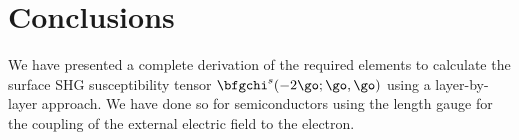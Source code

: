 \documentclass[floatfix,prb,aps,superscriptaddress,11pt,preprint,letterpaper]{revtex4}
\begin{document}
\section{Conclusions}\label{con}

We have presented a complete derivation of the required elements to
calculate the surface SHG susceptibility tensor $\bfgchi^s(-2\go;\go,\go)$ 
using a layer-by-layer approach. We have done so for semiconductors using 
the length gauge for the coupling of the external electric field to the 
electron. 

\appendix
%
%
%
%
%
%

%

\end{document}

